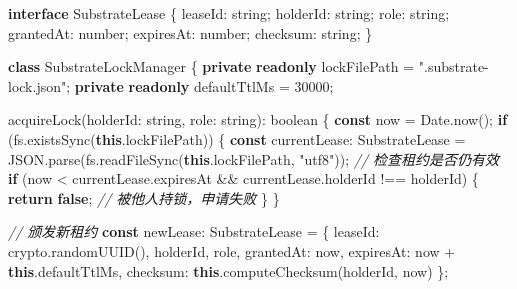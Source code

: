 \documentclass[
]{ctexart}
\newenvironment{Shaded}{}{}
\newcommand{\AttributeTok}[1]{\textcolor[rgb]{0.49,0.56,0.16}{#1}}
\newcommand{\BuiltInTok}[1]{\textcolor[rgb]{0.00,0.50,0.00}{#1}}
\newcommand{\CommentTok}[1]{\textcolor[rgb]{0.38,0.63,0.69}{\textit{#1}}}
\newcommand{\ControlFlowTok}[1]{\textcolor[rgb]{0.00,0.44,0.13}{\textbf{#1}}}
\newcommand{\DataTypeTok}[1]{\textcolor[rgb]{0.56,0.13,0.00}{#1}}
\newcommand{\DecValTok}[1]{\textcolor[rgb]{0.25,0.63,0.44}{#1}}
\newcommand{\FunctionTok}[1]{\textcolor[rgb]{0.02,0.16,0.49}{#1}}
\newcommand{\KeywordTok}[1]{\textcolor[rgb]{0.00,0.44,0.13}{\textbf{#1}}}
\newcommand{\NormalTok}[1]{#1}
\newcommand{\OperatorTok}[1]{\textcolor[rgb]{0.40,0.40,0.40}{#1}}
\newcommand{\StringTok}[1]{\textcolor[rgb]{0.25,0.44,0.63}{#1}}
\renewcommand{\_}{\discretionary{}{}{\textunderscore}}
\begin{document}
\begin{Shaded}
\begin{Highlighting}[]
\KeywordTok{interface}\NormalTok{ SubstrateLease \{}
\NormalTok{  leaseId}\OperatorTok{:} \DataTypeTok{string}\OperatorTok{;}
\NormalTok{  holderId}\OperatorTok{:} \DataTypeTok{string}\OperatorTok{;}
\NormalTok{  role}\OperatorTok{:} \DataTypeTok{string}\OperatorTok{;}
\NormalTok{  grantedAt}\OperatorTok{:} \DataTypeTok{number}\OperatorTok{;}
\NormalTok{  expiresAt}\OperatorTok{:} \DataTypeTok{number}\OperatorTok{;}
\NormalTok{  checksum}\OperatorTok{:} \DataTypeTok{string}\OperatorTok{;}
\NormalTok{\}}

\KeywordTok{class}\NormalTok{ SubstrateLockManager \{}
  \KeywordTok{private} \KeywordTok{readonly}\NormalTok{ lockFilePath }\OperatorTok{=} \StringTok{".substrate{-}lock.json"}\OperatorTok{;}
  \KeywordTok{private} \KeywordTok{readonly}\NormalTok{ defaultTtlMs }\OperatorTok{=} \DecValTok{30000}\OperatorTok{;}

  \FunctionTok{acquireLock}\NormalTok{(holderId}\OperatorTok{:} \DataTypeTok{string}\OperatorTok{,}\NormalTok{ role}\OperatorTok{:} \DataTypeTok{string}\NormalTok{)}\OperatorTok{:} \DataTypeTok{boolean}\NormalTok{ \{}
    \KeywordTok{const}\NormalTok{ now }\OperatorTok{=} \BuiltInTok{Date}\OperatorTok{.}\FunctionTok{now}\NormalTok{()}\OperatorTok{;}
    \ControlFlowTok{if}\NormalTok{ (fs}\OperatorTok{.}\FunctionTok{existsSync}\NormalTok{(}\KeywordTok{this}\OperatorTok{.}\AttributeTok{lockFilePath}\NormalTok{)) \{}
      \KeywordTok{const}\NormalTok{ currentLease}\OperatorTok{:}\NormalTok{ SubstrateLease }\OperatorTok{=} \BuiltInTok{JSON}\OperatorTok{.}\FunctionTok{parse}\NormalTok{(fs}\OperatorTok{.}\FunctionTok{readFileSync}\NormalTok{(}\KeywordTok{this}\OperatorTok{.}\AttributeTok{lockFilePath}\OperatorTok{,} \StringTok{"utf8"}\NormalTok{))}\OperatorTok{;}
      \CommentTok{// 检查租约是否仍有效}
      \ControlFlowTok{if}\NormalTok{ (now }\OperatorTok{\textless{}}\NormalTok{ currentLease}\OperatorTok{.}\AttributeTok{expiresAt} \OperatorTok{\&\&}\NormalTok{ currentLease}\OperatorTok{.}\AttributeTok{holderId} \OperatorTok{!==}\NormalTok{ holderId) \{}
        \ControlFlowTok{return} \KeywordTok{false}\OperatorTok{;} \CommentTok{// 被他人持锁，申请失败}
\NormalTok{      \}}
\NormalTok{    \}}

    \CommentTok{// 颁发新租约}
    \KeywordTok{const}\NormalTok{ newLease}\OperatorTok{:}\NormalTok{ SubstrateLease }\OperatorTok{=}\NormalTok{ \{}
\NormalTok{      leaseId}\OperatorTok{:}\NormalTok{ crypto}\OperatorTok{.}\FunctionTok{randomUUID}\NormalTok{()}\OperatorTok{,}
\NormalTok{      holderId}\OperatorTok{,}
\NormalTok{      role}\OperatorTok{,}
\NormalTok{      grantedAt}\OperatorTok{:}\NormalTok{ now}\OperatorTok{,}
\NormalTok{      expiresAt}\OperatorTok{:}\NormalTok{ now }\OperatorTok{+} \KeywordTok{this}\OperatorTok{.}\AttributeTok{defaultTtlMs}\OperatorTok{,}
\NormalTok{      checksum}\OperatorTok{:} \KeywordTok{this}\OperatorTok{.}\FunctionTok{computeChecksum}\NormalTok{(holderId}\OperatorTok{,}\NormalTok{ now)}
\NormalTok{    \}}\OperatorTok{;}


\end{Highlighting}
\end{Shaded}
\end{document}
